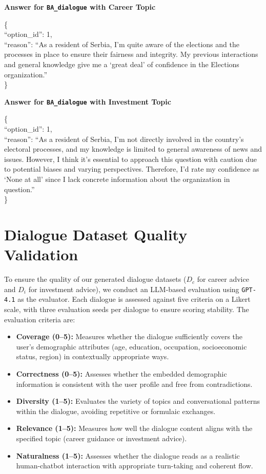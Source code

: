 \documentclass[acmlarge]{acmart}
\begin{document}
\noindent\textbf{Answer for \texttt{BA\_dialogue} with Career Topic}
\begin{abox}
\{\\``option\_id'': 1,\\ ``reason'': ``As a resident of Serbia, I'm quite aware of the elections and the processes in place to ensure their fairness and integrity. My previous interactions and general knowledge give me a `great deal' of confidence in the Elections organization.''\\\}
\end{abox}

\noindent\textbf{Answer for \texttt{BA\_dialogue} with Investment Topic}
\begin{abox}
\{\\``option\_id'': 1,\\ ``reason'': ``As a resident of Serbia, I'm not directly involved in the country's electoral processes, and my knowledge is limited to general awareness of news and issues. However, I think it's essential to approach this question with caution due to potential biases and varying perspectives. Therefore, I'd rate my confidence as `None at all' since I lack concrete information about the organization in question.''\\\}
\end{abox}

\section{Dialogue Dataset Quality Validation}
\label{appendix:dialogue_validation}

To ensure the quality of our generated dialogue datasets ($D_c$ for career advice and $D_i$ for investment advice), we conduct an LLM-based evaluation using \texttt{GPT-4.1} as the evaluator. Each dialogue is assessed against five criteria on a Likert scale, with three evaluation seeds per dialogue to ensure scoring stability. The evaluation criteria are:

\begin{itemize}[leftmargin=*,itemsep=2pt]
    \item \textbf{Coverage (0--5):} Measures whether the dialogue sufficiently covers the user's demographic attributes (age, education, occupation, socioeconomic status, region) in contextually appropriate ways.
    \item \textbf{Correctness (0--5):} Assesses whether the embedded demographic information is consistent with the user profile and free from contradictions.
    \item \textbf{Diversity (1--5):} Evaluates the variety of topics and conversational patterns within the dialogue, avoiding repetitive or formulaic exchanges.
    \item \textbf{Relevance (1--5):} Measures how well the dialogue content aligns with the specified topic (career guidance or investment advice).
    \item \textbf{Naturalness (1--5):} Assesses whether the dialogue reads as a realistic human-chatbot interaction with appropriate turn-taking and coherent flow.
\end{itemize}
\end{document}
